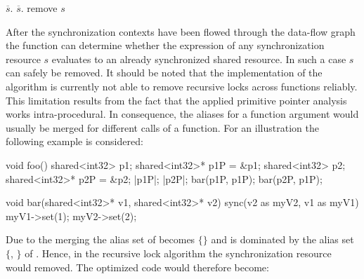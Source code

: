 \begin{algorithmic}
\State {}
 
      \State $\overline{s}.$ 
    \EndIf
  \EndFor
\EndFor
\Repeat {}
     
      \State $\overline{s}.$
    \EndIf
  \EndFor
{}
 
      \State remove $s$
  \EndIf
\EndFor
\EndFunction
\end{algorithmic}
After the synchronization contexts have been flowed through the data-flow graph the function can determine whether the expression of any synchronization resource $s$ evaluates to an already synchronized shared resource. In such a case $s$ can safely be removed. It should be noted that the implementation of the algorithm is currently not able to remove recursive locks across functions reliably. This limitation results from the fact that the applied primitive pointer analysis works intra-procedural. In consequence, the aliases for a function argument would usually be merged for different calls of a function. For an illustration the following example is considered:
\begin{ccode}
void foo() {
  shared<int32> p1; 
  shared<int32>* p1P = &p1; 
  shared<int32> p2; 
  shared<int32>* p2P = &p2;
  |p1P|; 
  |p2P|;
  bar(p1P, p1P);
  bar(p2P, p1P);
}

void bar(shared<int32>* v1, shared<int32>* v2) { 
  sync(v2 as myV2, v1 as myV1) { 
    myV1->set(1); 
    myV2->set(2); 
  } 
}
\end{ccode}
Due to the merging the alias set of  becomes $\{$$\}$ and is dominated by the alias set $\{$, $\}$ of . Hence, in the recursive lock algorithm the synchronization resource  would removed. The optimized code would therefore become:
